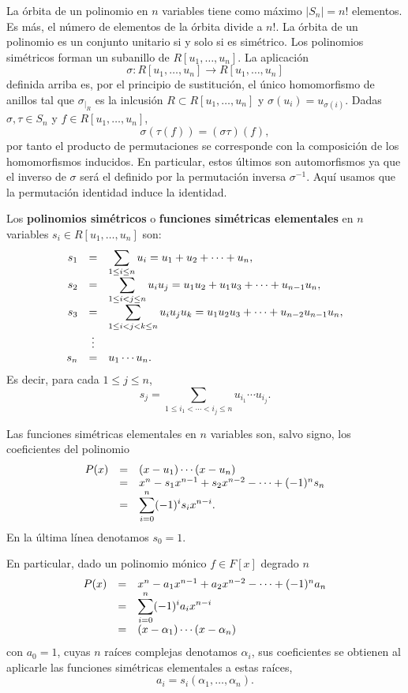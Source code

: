 
La órbita de un polinomio en \(n\) variables tiene como máximo
\(|S_n|=n!\) elementos. Es más, el número de elementos de la órbita
divide a \(n!\). La órbita de un polinomio es un conjunto unitario si y
solo si es simétrico. Los polinomios simétricos forman un subanillo de
\(R[u_1,\dots,u_n]\). La aplicación
\[\sigma\colon R[u_1,\dots,u_n]\rightarrow R[u_1,\dots,u_n]\]
definida arriba es, por el principio de sustitución, el único
homomorfismo de anillos tal que \(\sigma_{|_R}\) es la inlcusión
\(R\subset R[u_1,\dots,u_n]\) y \(\sigma(u_i)=u_{\sigma(i)}\). Dadas
\(\sigma,\tau\in S_n\) y \(f\in R[u_1,\dots,u_n]\),
\[\sigma(\tau(f))=(\sigma\tau)(f),\] por tanto el producto de
permutaciones se corresponde con la composición de los homomorfismos
inducidos. En particular, estos últimos son automorfismos ya que el
inverso de \(\sigma\) será el definido por la permutación inversa
\(\sigma^{-1}\). Aquí usamos que la permutación identidad induce la
identidad. 


Los \textbf{polinomios simétricos} o \textbf{funciones simétricas
elementales} en \(n\) variables \(s_i\in R[u_1,\dots,u_n]\) son: \[
\begin{array}{rcl}
s_1&=&\displaystyle \sum_{1\leq i\leq n}u_i=u_1+u_2+\cdots+u_n,\cr
s_2&=&\displaystyle \sum_{1\leq i < j\leq n}u_iu_j=u_1u_2+u_1u_3+\cdots+u_{n-1}u_n,\cr
s_3&=&\displaystyle \sum_{1\leq i < j < k\leq n}u_iu_ju_k=u_1u_2u_3+\cdots+u_{n-2}u_{n-1}u_n,\cr
&\vdots&\cr
s_n&=&u_1\cdots u_n.
\end{array}
\] Es decir, para cada \(1\leq j\leq n\), \[
s_j=\sum_{1\leq i_1<\cdots<i_j\leq n}u_{i_1}\cdots u_{i_j}.
\] 


Las funciones simétricas elementales en \(n\) variables son, salvo
signo, los coeficientes del polinomio \[
\begin{array}{rcl}
P(x)&=&(x-u_1)\cdots (x-u_n)\cr
&=&x^n-s_1x^{n-1}+s_2x^{n-2}-\cdots+(-1)^ns_n\cr
&=&\displaystyle \sum_{i=0}^n(-1)^is_ix^{n-i}.
\end{array}
\] En la última línea denotamos \(s_0=1\).

En particular, dado un polinomio mónico \(f\in F[x]\) degrado \(n\) \[
\begin{array}{rcl}
P(x)&=&x^n-a_1x^{n-1}+a_2x^{n-2}-\cdots+(-1)^na_n\cr
&=&\displaystyle \sum_{i=0}^n(-1)^ia_ix^{n-i}\cr
&=&(x-\alpha_1)\cdots (x-\alpha_n)
\end{array}
\] con \(a_0=1\), cuyas \(n\) raíces complejas denotamos \(\alpha_i\),
sus coeficientes se obtienen al aplicarle las funciones simétricas
elementales a estas raíces, \[a_i=s_i(\alpha_1,\dots,\alpha_n).\]

